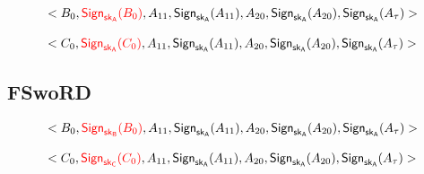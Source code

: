 \documentclass[%
  slidesonly,%
  semlayer%
  ]{seminar}                                  %
\newcommand{\sk}{\sf{sk}}
\begin{document}
\begin{slide}
        
        \begin{equation*}
          \begin{array}{l}
            <B_{0}, \textcolor{red}{\textsf{Sign}_{\sk_{A}}(B_{0})},A_{11},\textsf{Sign}_{\sk_{A}}(A_{11}),A_{20},\textsf{Sign}_{\sk_{A}}(A_{20}),\textsf{Sign}_{\sk_{A}}(A_{\tau})>\\
              \\
            <C_{0}, \textcolor{red}{\textsf{Sign}_{\sk_{A}}(C_{0})},A_{11},\textsf{Sign}_{\sk_{A}}(A_{11}),A_{20},\textsf{Sign}_{\sk_{A}}(A_{20}),\textsf{Sign}_{\sk_{A}}(A_{\tau})>\\ 
          \end{array}
        \end{equation*}
        \clearpage

      \subsection*{FSwoRD}
        \begin{equation*}
          \begin{array}{l}
            <B_{0}, \textcolor{red}{\textsf{Sign}_{\sk_{B}}(B_{0})},A_{11},\textsf{Sign}_{\sk_{A}}(A_{11}),A_{20},\textsf{Sign}_{\sk_{A}}(A_{20}),\textsf{Sign}_{\sk_{A}}(A_{\tau})>\\
              \\
            <C_{0}, \textcolor{red}{\textsf{Sign}_{\sk_{C}}(C_{0})},A_{11},\textsf{Sign}_{\sk_{A}}(A_{11}),A_{20},\textsf{Sign}_{\sk_{A}}(A_{20}),\textsf{Sign}_{\sk_{A}}(A_{\tau})>\\ 
          \end{array}
        \end{equation*}


\end{slide}
\end{document}
